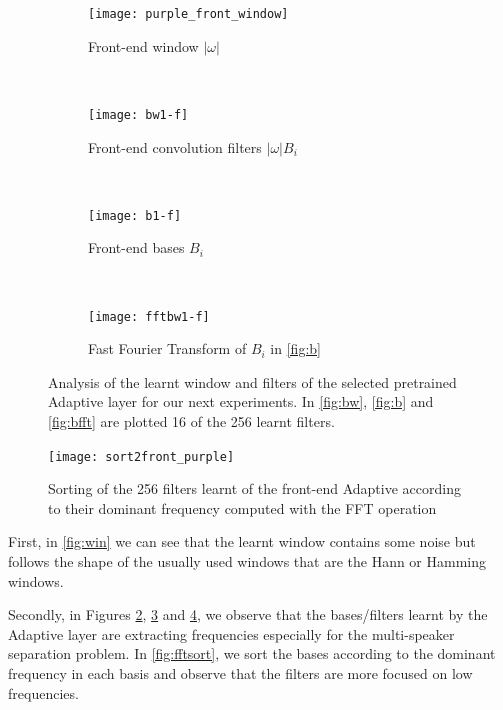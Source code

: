 \documentclass[master, tikz, final,11pt, dvipdfmx]{iscs-thesis}
\begin{document}
\begin{figure}[h!]
\centering
\begin{subfigure}[b]{0.45\textwidth}
\texttt{[image: purple\_front\_window]}
\caption{Front-end window $|\omega|$}
\label{fig:win} 
\end{subfigure}
~
\begin{subfigure}[b]{0.45\textwidth}
\texttt{[image: bw1-f]}
\captionsetup{justification=centering}
\caption{Front-end convolution filters $|\omega| B_i$}
\label{fig:bw} 
\end{subfigure}
\\
\begin{subfigure}[b]{0.45\textwidth}
\texttt{[image: b1-f]}
\captionsetup{justification=centering}
\caption{Front-end bases $B_i$}
\label{fig:b} 
\end{subfigure}
~
\begin{subfigure}[b]{0.45\textwidth}
\texttt{[image: fftbw1-f]}
\captionsetup{justification=centering}
\caption{Fast Fourier Transform of $B_i$ in \autoref{fig:b}}
\label{fig:bfft} 
\end{subfigure}

\caption[Adaptive layer pretraining results]{Analysis of the learnt window and filters of the selected pretrained Adaptive layer for our next experiments. In \autoref{fig:bw}, \autoref{fig:b} and \autoref{fig:bfft} are plotted 16 of the 256 learnt filters.}
\label{fig:pretrainingadapt} 

\end{figure}

\begin{figure}[h!]
\centering
\texttt{[image: sort2front\_purple]}
\caption{Sorting of the 256 filters learnt of the front-end Adaptive according to their dominant frequency computed with the FFT operation}
\label{fig:fftsort} 
\end{figure}

First, in \autoref{fig:win} we can see that the learnt window contains some noise but follows the shape of the usually used windows that are the Hann or Hamming windows.

Secondly, in Figures \ref{fig:bw}, \ref{fig:b} and \ref{fig:bfft}, we observe that the bases/filters learnt by the Adaptive layer are extracting frequencies especially for the multi-speaker separation problem. In \autoref{fig:fftsort}, we sort the bases according to the dominant frequency in each basis and observe that the filters are more focused on low frequencies.
\end{document}
